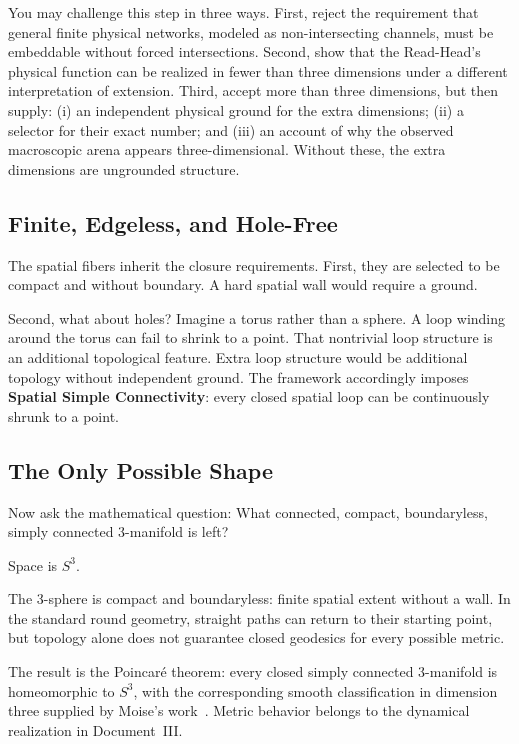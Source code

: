 \documentclass[11pt]{article}
\theoremstyle{canonstyle}
\providecommand{\Sthree}{S^3}
\begin{document}
\begin{ifyoudisagree}
You may challenge this step in three ways. First, reject the requirement that general finite physical networks, modeled as non-intersecting channels, must be embeddable without forced intersections. Second, show that the Read-Head's physical function can be realized in fewer than three dimensions under a different interpretation of extension. Third, accept more than three dimensions, but then supply: (i) an independent physical ground for the extra dimensions; (ii) a selector for their exact number; and (iii) an account of why the observed macroscopic arena appears three-dimensional. Without these, the extra dimensions are ungrounded structure.
\end{ifyoudisagree}

\subsection{Finite, Edgeless, and Hole-Free}

The spatial fibers inherit the closure requirements. First, they are selected to be compact and without boundary. A hard spatial wall would require a ground.

Second, what about holes? Imagine a torus rather than a sphere. A loop winding around the torus can fail to shrink to a point. That nontrivial loop structure is an additional topological feature. Extra loop structure would be additional topology without independent ground. The framework accordingly imposes \textbf{Spatial Simple Connectivity}: every closed spatial loop can be continuously shrunk to a point.

\subsection{The Only Possible Shape}

Now ask the mathematical question: What connected, compact, boundaryless, simply connected 3-manifold is left?

\begin{keyresult}
Space is $\Sthree$.
\end{keyresult}

The 3-sphere is compact and boundaryless: finite spatial extent without a wall. In the standard round geometry, straight paths can return to their starting point, but topology alone does not guarantee closed geodesics for every possible metric.

\begin{forthecurious}
The result is the Poincar\'e theorem: every closed simply connected 3-manifold is homeomorphic to $\Sthree$, with the corresponding smooth classification in dimension three supplied by Moise's work~\cite{Perelman,Moise}. Metric behavior belongs to the dynamical realization in Document~III.
\end{forthecurious}
\end{document}
